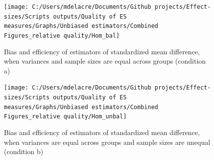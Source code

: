 \documentclass[
  english,
  man,floatsintext]{apa6}
\begin{document}
\begin{landscape}
\newpage

\begin{figure}

{\centering \texttt{[image: C:/Users/mdelacre/Documents/Github projects/Effect-sizes/Scripts outputs/Quality of ES measures/Graphs/Unbiased estimators/Combined Figures\_relative quality/Hom\_bal]} 

}

\caption{Bias and efficiency of estimators of standardized mean difference, when variances and sample sizes are equal across groups (condition a)}\label{fig:idHombal}
\end{figure}
\end{landscape}
\newpage
\begin{landscape}

\begin{figure}

{\centering \texttt{[image: C:/Users/mdelacre/Documents/Github projects/Effect-sizes/Scripts outputs/Quality of ES measures/Graphs/Unbiased estimators/Combined Figures\_relative quality/Hom\_unbal]} 

}

\caption{Bias and efficiency of estimators of standardized mean difference, when variances are equal across groups and sample sizes are unequal (condition b)}\label{fig:idHomunbal}
\end{figure}

\end{landscape}
\end{document}

